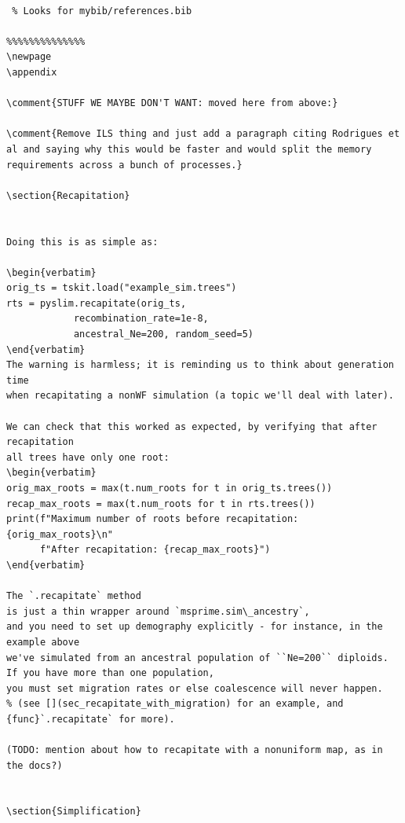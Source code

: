 \documentclass[12pt]{article}
\newcommand{\comment}[1]{\textit{\color{green} #1}}
\begin{document}
\begin{lstlisting}[language=slim]

 % Looks for mybib/references.bib

%%%%%%%%%%%%%%
\newpage
\appendix

\comment{STUFF WE MAYBE DON'T WANT: moved here from above:}

\comment{Remove ILS thing and just add a paragraph citing Rodrigues et al and saying why this would be faster and would split the memory requirements across a bunch of processes.}

\section{Recapitation}


Doing this is as simple as:

\begin{verbatim}
orig_ts = tskit.load("example_sim.trees")
rts = pyslim.recapitate(orig_ts,
            recombination_rate=1e-8,
            ancestral_Ne=200, random_seed=5)
\end{verbatim}
The warning is harmless; it is reminding us to think about generation time
when recapitating a nonWF simulation (a topic we'll deal with later).

We can check that this worked as expected, by verifying that after recapitation
all trees have only one root:
\begin{verbatim}
orig_max_roots = max(t.num_roots for t in orig_ts.trees())
recap_max_roots = max(t.num_roots for t in rts.trees())
print(f"Maximum number of roots before recapitation: {orig_max_roots}\n"
      f"After recapitation: {recap_max_roots}")
\end{verbatim}

The `.recapitate` method
is just a thin wrapper around `msprime.sim\_ancestry`,
and you need to set up demography explicitly - for instance, in the example above
we've simulated from an ancestral population of ``Ne=200`` diploids.
If you have more than one population,
you must set migration rates or else coalescence will never happen.
% (see [](sec_recapitate_with_migration) for an example, and {func}`.recapitate` for more).

(TODO: mention about how to recapitate with a nonuniform map, as in the docs?)


\section{Simplification}



\end{lstlisting}
\end{document}
